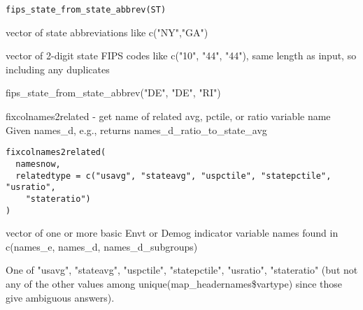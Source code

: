 \documentclass[a4paper]{book}
\begin{document}
%
\begin{Usage}
\begin{verbatim}
fips_state_from_state_abbrev(ST)
\end{verbatim}
\end{Usage}
%
\begin{Arguments}
\begin{ldescription}
\item[\code{ST}] vector of state abbreviations like c("NY","GA")
\end{ldescription}
\end{Arguments}
%
\begin{Value}
vector of 2-digit state FIPS codes like c("10", "44", "44"),
same length as input, so including any duplicates
\end{Value}
%
\begin{Examples}
\begin{ExampleCode}
fips_state_from_state_abbrev("DE", "DE", "RI")
\end{ExampleCode}
\end{Examples}
%
\begin{Description}\relax
fixcolnames2related - get name of related avg, pctile, or ratio variable name
Given names\_d, e.g., returns names\_d\_ratio\_to\_state\_avg
\end{Description}
%
\begin{Usage}
\begin{verbatim}
fixcolnames2related(
  namesnow,
  relatedtype = c("usavg", "stateavg", "uspctile", "statepctile", "usratio",
    "stateratio")
)
\end{verbatim}
\end{Usage}
%
\begin{Arguments}
\begin{ldescription}
\item[\code{namesnow}] vector of one or more basic Envt or Demog indicator variable names
found in c(names\_e, names\_d, names\_d\_subgroups)

\item[\code{relatedtype}] One of "usavg", "stateavg", "uspctile", "statepctile", "usratio", "stateratio"
(but not any of the other values among
unique(map\_headernames\$vartype) since those give ambiguous answers).
\end{ldescription}
\end{Arguments}
\end{document}
